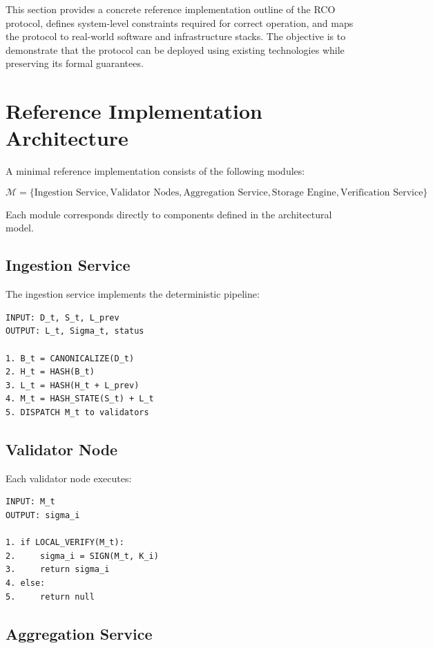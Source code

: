This section provides a concrete reference implementation outline of the RCO protocol, defines system-level constraints required for correct operation, and maps the protocol to real-world software and infrastructure stacks. The objective is to demonstrate that the protocol can be deployed using existing technologies while preserving its formal guarantees.

\section{Reference Implementation Architecture}

A minimal reference implementation consists of the following modules:

\begin{equation}
\mathcal{M} = \{\text{Ingestion Service}, \text{Validator Nodes}, \text{Aggregation Service}, \text{Storage Engine}, \text{Verification Service}\}
\end{equation}

Each module corresponds directly to components defined in the architectural model.

\subsection{Ingestion Service}

The ingestion service implements the deterministic pipeline:

\begin{verbatim}
INPUT: D_t, S_t, L_prev
OUTPUT: L_t, Sigma_t, status

1. B_t = CANONICALIZE(D_t)
2. H_t = HASH(B_t)
3. L_t = HASH(H_t + L_prev)
4. M_t = HASH_STATE(S_t) + L_t
5. DISPATCH M_t to validators
\end{verbatim}

\subsection{Validator Node}

Each validator node executes:

\begin{verbatim}
INPUT: M_t
OUTPUT: sigma_i

1. if LOCAL_VERIFY(M_t):
2.     sigma_i = SIGN(M_t, K_i)
3.     return sigma_i
4. else:
5.     return null
\end{verbatim}

\subsection{Aggregation Service}

